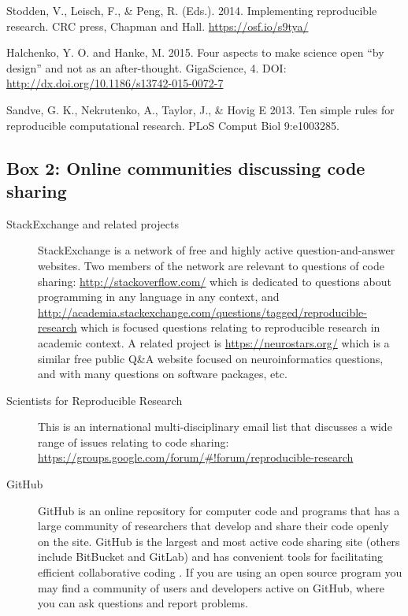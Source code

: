\documentclass[11pt]{article}
\begin{document}
Stodden, V., Leisch, F., \& Peng, R. (Eds.). 2014. Implementing reproducible research. CRC press, Chapman and Hall. \url{https://osf.io/s9tya/}

Halchenko, Y. O. and Hanke, M. 2015. Four aspects to make science open
``by design'' and not as an after-thought. GigaScience, 4. DOI:
\url{http://dx.doi.org/10.1186/s13742-015-0072-7}

Sandve, G. K., Nekrutenko,  A., Taylor,  J., \& Hovig E 2013. Ten simple rules for reproducible computational research. PLoS Comput Biol 9:e1003285.

\clearpage

\subsection*{Box 2: Online communities discussing code sharing}

\begin{description}

\item [StackExchange and related projects] StackExchange is a network of free and highly active question-and-answer websites.  Two members of the network are relevant to questions of code sharing: \url{http://stackoverflow.com/} which is dedicated to questions about programming in any language in any context, and \url{http://academia.stackexchange.com/questions/tagged/reproducible-research} which is focused questions relating to reproducible research in academic context. A related project is \url{https://neurostars.org/} which is a similar free public Q\&A website focused on neuroinformatics questions, and with many questions on software packages, etc. 

\item [Scientists for Reproducible Research] This is an international multi-disciplinary email list that discusses a wide range of issues relating to code sharing: \url{https://groups.google.com/forum/\#!forum/reproducible-research}

\item [GitHub] GitHub is an online repository for computer code and programs that has a large community of researchers that develop and share their code openly on the site. GitHub is the largest and most active code sharing site (others include BitBucket and GitLab) and has convenient tools for facilitating efficient collaborative coding \cite{tippmann2014my,Perez-Riverol2016}. If you are using an open source program you may find a community of users and developers active on GitHub, where you can ask questions and report problems.

\end{description}
\end{document}
